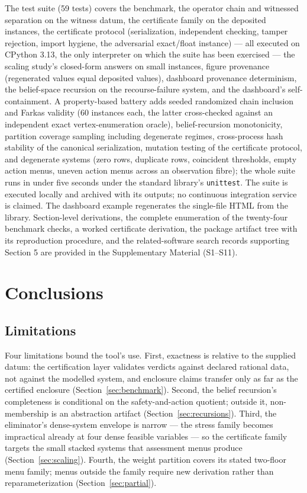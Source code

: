 \documentclass[3p,11pt]{elsarticle}
\begin{document}
The test suite (59 tests) covers the benchmark, the operator chain and
witnessed separation on the witness datum, the certificate family on the
deposited instances, the certificate protocol (serialization, independent
checking, tamper rejection, import hygiene, the adversarial exact/float
instance) --- all executed on CPython 3.13, the only interpreter on which
the suite has been exercised --- the scaling study's closed-form answers
on small instances,
figure provenance (regenerated values equal deposited values), dashboard
provenance determinism, the belief-space recursion on the recourse-failure
system, and the dashboard's self-containment. A property-based battery
adds seeded randomized chain inclusion and Farkas validity (60 instances
each, the latter cross-checked against an independent exact
vertex-enumeration oracle), belief-recursion monotonicity, partition
coverage sampling including degenerate regimes, cross-process hash
stability of the canonical serialization, mutation testing of the
certificate protocol, and degenerate systems (zero rows, duplicate rows,
coincident thresholds, empty action menus, uneven action menus across an
observation fibre); the whole suite runs in under five seconds under the standard library's \texttt{unittest}. The suite
is executed locally and archived with its outputs; no continuous
integration service is claimed.
The dashboard example regenerates the single-file HTML from the library.
Section-level derivations, the complete enumeration of the twenty-four
benchmark checks, a worked certificate derivation, the package artifact
tree with its reproduction procedure, and the related-software search
records supporting Section 5 are provided in the Supplementary Material
(S1--S11).

\section{Conclusions}\label{sec:conclusions}

\subsection{Limitations}

Four limitations bound the tool's use. First, exactness is relative to
the supplied datum: the certification layer validates verdicts against
declared rational data, not against the modelled system, and enclosure
claims transfer only as far as the certified enclosure
(Section~\ref{sec:benchmark}). Second, the belief recursion's
completeness is conditional on the safety-and-action quotient; outside
it, non-membership is an abstraction artifact
(Section~\ref{sec:recursions}). Third, the eliminator's dense-system
envelope is narrow --- the stress family becomes impractical already at
four dense feasible variables --- so the certificate family targets the
small stacked systems that assessment menus produce
(Section~\ref{sec:scaling}). Fourth, the weight partition covers its
stated two-floor menu family; menus outside the family require new
derivation rather than reparameterization (Section~\ref{sec:partial}).
\end{document}
